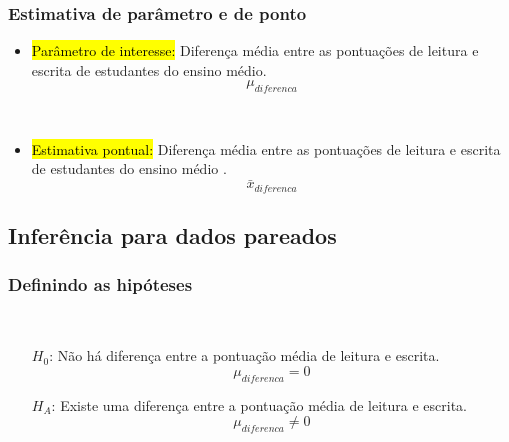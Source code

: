 
\begin{frame}
\frametitle{Estimativa de parâmetro e de ponto}

\begin{itemize}
\justifying
\item \hl{Parâmetro de interesse:} Diferença média entre as pontuações de leitura e escrita de  estudantes do ensino médio.
\[ \mu_{diferenca} \]

$\:$ \\

\pause
\justifying
\item \hl{Estimativa pontual:} Diferença média entre as pontuações de leitura e escrita de estudantes do ensino médio .
\[ \bar{x}_{diferenca} \]

\end{itemize}

\end{frame}


\subsection{Inferência para dados pareados}

\begin{frame}
\frametitle{Definindo as hipóteses}
\justifying
{}

\pause


$\:$ \\

\pause
\justifying
{}

\pause

\begin{itemize}
\justifying
\item[$H_0$:] Não há diferença entre a pontuação média de leitura e escrita.
\[ \mu_{diferenca} = 0 \]
\justifying
\item[$H_A$:] Existe uma diferença entre a pontuação média de leitura e escrita.
\[ \mu_{diferenca} \ne 0 \]
\end{itemize}

\end{frame}

